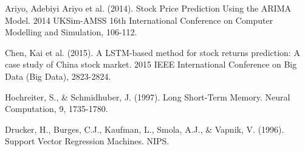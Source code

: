 \documentclass[final]{beamer}
\begin{document}
\begin{frame}[t]
\begin{multicols}{3}
\begin{thebibliography}{99}
 Ariyo, Adebiyi Ariyo et al. (2014). Stock Price Prediction Using the ARIMA Model. 2014 UKSim-AMSS 16th International Conference on Computer Modelling and Simulation, 106-112.

 Chen, Kai et al. (2015). A LSTM-based method for stock returns prediction: A case study of China stock market. 2015 IEEE International Conference on Big Data (Big Data), 2823-2824.

 Hochreiter, S., \& Schmidhuber, J. (1997). Long Short-Term Memory. Neural Computation, 9, 1735-1780.

 Drucker, H., Burges, C.J., Kaufman, L., Smola, A.J., \& Vapnik, V. (1996). Support Vector Regression Machines. NIPS.

\end{thebibliography}

\end{multicols}

\end{frame}
\end{document}
